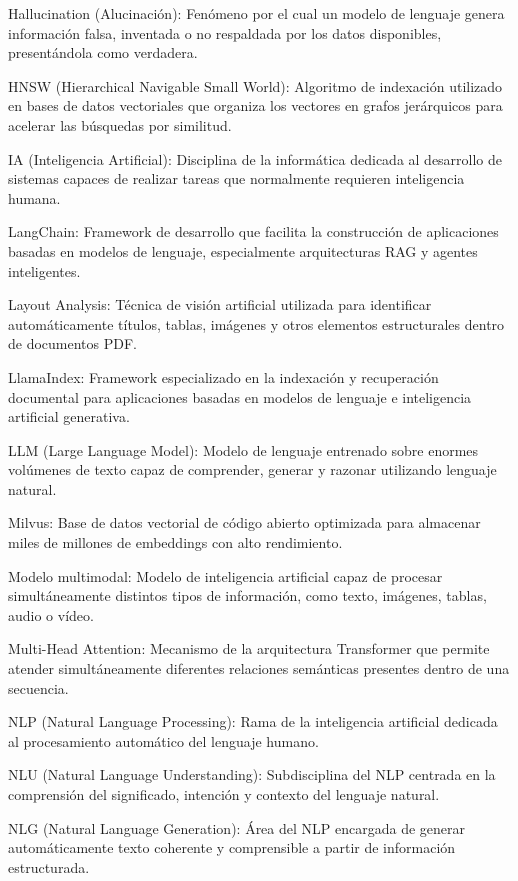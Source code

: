 Hallucination (Alucinación): Fenómeno por el cual un modelo de lenguaje genera información falsa, inventada o no respaldada por los datos disponibles, presentándola como verdadera.

HNSW (Hierarchical Navigable Small World): Algoritmo de indexación utilizado en bases de datos vectoriales que organiza los vectores en grafos jerárquicos para acelerar las búsquedas por similitud.

IA (Inteligencia Artificial): Disciplina de la informática dedicada al desarrollo de sistemas capaces de realizar tareas que normalmente requieren inteligencia humana.

LangChain: Framework de desarrollo que facilita la construcción de aplicaciones basadas en modelos de lenguaje, especialmente arquitecturas RAG y agentes inteligentes.

Layout Analysis: Técnica de visión artificial utilizada para identificar automáticamente títulos, tablas, imágenes y otros elementos estructurales dentro de documentos PDF.

LlamaIndex: Framework especializado en la indexación y recuperación documental para aplicaciones basadas en modelos de lenguaje e inteligencia artificial generativa.

LLM (Large Language Model): Modelo de lenguaje entrenado sobre enormes volúmenes de texto capaz de comprender, generar y razonar utilizando lenguaje natural.

Milvus: Base de datos vectorial de código abierto optimizada para almacenar miles de millones de embeddings con alto rendimiento.

Modelo multimodal: Modelo de inteligencia artificial capaz de procesar simultáneamente distintos tipos de información, como texto, imágenes, tablas, audio o vídeo.

Multi-Head Attention: Mecanismo de la arquitectura Transformer que permite atender simultáneamente diferentes relaciones semánticas presentes dentro de una secuencia.

NLP (Natural Language Processing): Rama de la inteligencia artificial dedicada al procesamiento automático del lenguaje humano.

NLU (Natural Language Understanding): Subdisciplina del NLP centrada en la comprensión del significado, intención y contexto del lenguaje natural.

NLG (Natural Language Generation): Área del NLP encargada de generar automáticamente texto coherente y comprensible a partir de información estructurada.

